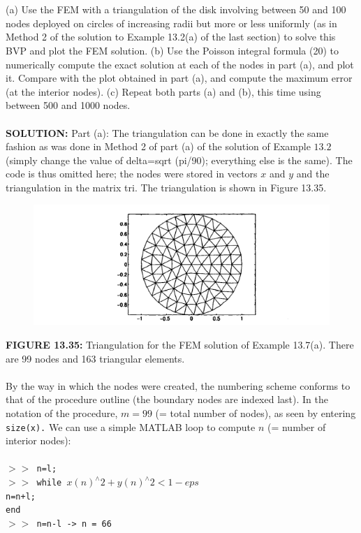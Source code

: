 \documentclass[../main.tex]{subfiles}
\begin{document}
\\
\\
(a) Use the FEM with a triangulation of the disk involving between 50 and 100 nodes deployed on circles of increasing radii but more or less uniformly (as in Method 2 of the solution to Example 13.2(a) of the last section) to solve this BVP and plot the FEM solution.
(b) Use the Poisson integral formula (20) to numerically compute the exact solution at each of the nodes in part (a), and plot it. Compare with the plot obtained in part (a), and compute the maximum error (at the interior nodes).
(c) Repeat both parts (a) and (b), this time using between 500 and 1000 nodes.
\\
\\
\textbf{SOLUTION:} Part (a): The triangulation can be done in exactly the same fashion as was done in Method 2 of part (a) of the solution of Example $13.2$ (simply change the value of delta=sqrt (pi/90); everything else is the same). The code is thus omitted here; the nodes were stored in vectors $x$ and $y$ and the triangulation in the matrix tri. The triangulation is shown in Figure 13.35.
\begin{figure}[H]
\includegraphics[width=0.9\linewidth]{21}
	\centering
	\label{pfig:ch13_21}
\end{figure}
\textbf{FIGURE 13.35:} Triangulation for the FEM solution of Example 13.7(a). There are 99 
nodes and 163 triangular elements.
\\
\\
By the way in which the nodes were created, the numbering scheme conforms to that of the procedure outline (the boundary nodes are indexed last). In the notation of the procedure, $m=99$ (= total number of nodes), as seen by entering \texttt{size(x).} We can use a simple MATLAB loop to compute $n$ (= number of interior nodes):
\\
\\
\texttt{$>>$ n=l;\\
$>>$ while $x(n)^{\wedge} 2+y(n)^{\wedge}2<1-eps$
\\      n=n+l;
\\ end
\\ $>>$ n=n-l -> n = 66 }
\end{document}
